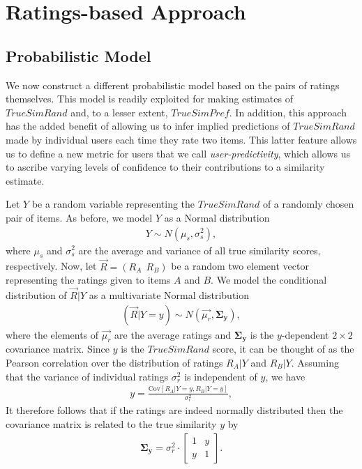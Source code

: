 \documentclass[11pt]{article}
\newcommand{\Cov}{\mathrm{Cov}}
\begin{document}
\section*{Ratings-based Approach}
\subsection*{Probabilistic Model}

We now construct a different probabilistic model based on the pairs of ratings
themselves. This model is readily exploited for making estimates of
$TrueSimRand$ and, to a lesser extent, $TrueSimPref$. In addition, this approach
has the added benefit of allowing us to infer implied predictions of
$TrueSimRand$ made by individual users each time they rate two items. This
latter feature allows us to define a new metric for users that we call {\em
user-predictivity}, which allows us to ascribe varying levels of confidence to
their contributions to a similarity estimate.

Let $Y$ be a random variable representing the $TrueSimRand$ of a randomly chosen
pair of items. As before, we model $Y$ as a Normal distribution
\begin{align}
Y \sim N(\mu_s, \sigma_s^2),
\end{align}
where $\mu_s$ and $\sigma_s^2$ are the average and variance of all true
similarity scores, respectively. Now, let $\vec{R} = \left(R_A~~R_B\right)$ be a
random two element vector representing the ratings given to items $A$ and $B$.
We model the conditional distribution of $\vec{R} | Y$ as a multivariate Normal
distribution
\begin{align}
(\vec{R} | Y=y) \sim N(\vec{\mu_r}, \mathbf{\Sigma_y}),
\end{align}
where the elements of $\vec{\mu_r}$ are the average ratings and
$\mathbf{\Sigma_y}$ is the $y$-dependent $2\times2$ covariance matrix.  Since
$y$ is the $TrueSimRand$ score, it can be thought of as the Pearson correlation
over the distribution of ratings $R_A | Y$ and $R_B | Y$. Assuming that the
variance of individual ratings $\sigma_r^2$ is independent of $y$, we have 
\begin{align}
y = \frac{\Cov{\left[R_A | Y=y , R_B | Y=y\right]}}{\sigma_r^2},
\end{align}
It therefore follows that if the ratings are indeed normally distributed 
then the covariance matrix is related to the true similarity $y$ by
\begin{align}
\mathbf{\Sigma_y} = \sigma_r^2 \cdot
\left[ \begin{array}{cc}  1 & y \\ y & 1 \end{array} \right].
\end{align}
\end{document}
